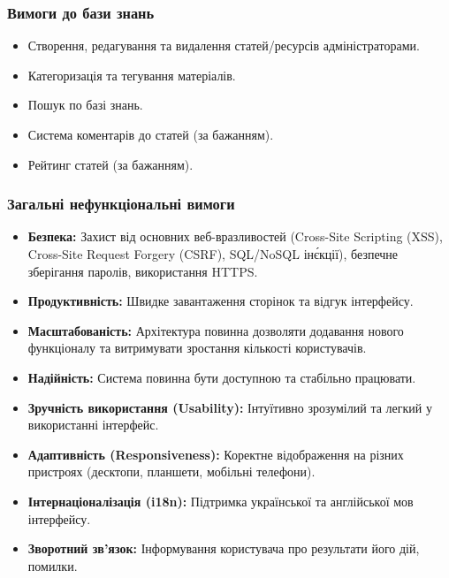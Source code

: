 \subsubsection{Вимоги до бази знань}
\begin{itemize}
    \item Створення, редагування та видалення статей/ресурсів адміністраторами.
    \item Категоризація та тегування матеріалів.
    \item Пошук по базі знань.
    \item Система коментарів до статей (за бажанням).
    \item Рейтинг статей (за бажанням).
\end{itemize}

\subsubsection{Загальні нефункціональні вимоги}
\begin{itemize}
    \item \textbf{Безпека:} Захист від основних веб-вразливостей (Cross-Site Scripting (XSS), Cross-Site Request Forgery (CSRF), SQL/NoSQL ін\'єкції), безпечне зберігання паролів, використання HTTPS.
    \item \textbf{Продуктивність:} Швидке завантаження сторінок та відгук інтерфейсу.
    \item \textbf{Масштабованість:} Архітектура повинна дозволяти додавання нового функціоналу та витримувати зростання кількості користувачів.
    \item \textbf{Надійність:} Система повинна бути доступною та стабільно працювати.
    \item \textbf{Зручність використання (Usability):} Інтуїтивно зрозумілий та легкий у використанні інтерфейс.
    \item \textbf{Адаптивність (Responsiveness):} Коректне відображення на різних пристроях (десктопи, планшети, мобільні телефони).
    \item \textbf{Інтернаціоналізація (i18n):} Підтримка української та англійської мов інтерфейсу.
    \item \textbf{Зворотний зв'язок:} Інформування користувача про результати його дій, помилки.
\end{itemize} 